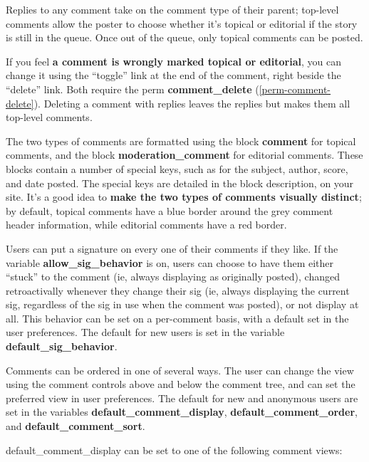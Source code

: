 Replies to any comment take on the comment type of their parent; top-level comments allow the poster to choose whether it's topical or editorial if the story is still in the queue. Once out of the queue, only topical comments can be posted.

If you feel {\bf a comment is wrongly marked topical or editorial}, you can change it using the ``toggle'' link at the end of the comment, right beside the ``delete'' link.  Both require the perm {\bf comment\_delete} (\ref{perm-comment-delete}).  Deleting a comment with replies leaves the replies but makes them all top-level comments.

The two types of comments are formatted using the block {\bf comment} for topical comments, and the block {\bf moderation\_comment} for editorial comments.  These blocks contain a number of special keys, such as for the subject, author, score, and date posted.  The special keys are detailed in the block description, on your site.  It's a good idea to {\bf make the two types of comments visually distinct}; by default, topical comments have a blue border around the grey comment header information, while editorial comments have a red border.

Users can put a signature on every one of their comments if they like.  If the variable {\bf allow\_sig\_behavior} is on, users can choose to have them either ``stuck'' to the comment (ie, always displaying as originally posted), changed retroactivally whenever they change their sig (ie, always displaying the current sig, regardless of the sig in use when the comment was posted), or not display at all.  This behavior can be set on a per-comment basis, with a default set in the user preferences.  The default for new users is set in the variable {\bf default\_sig\_behavior}.

Comments can be ordered in one of several ways.  The user can change the view using the comment controls above and below the comment tree, and can set the preferred view in user preferences.  The default for new and anonymous users are set in the variables {\bf default\_comment\_display}, {\bf default\_comment\_order}, and {\bf default\_comment\_sort}.

default\_comment\_display can be set to one of the following comment views:

